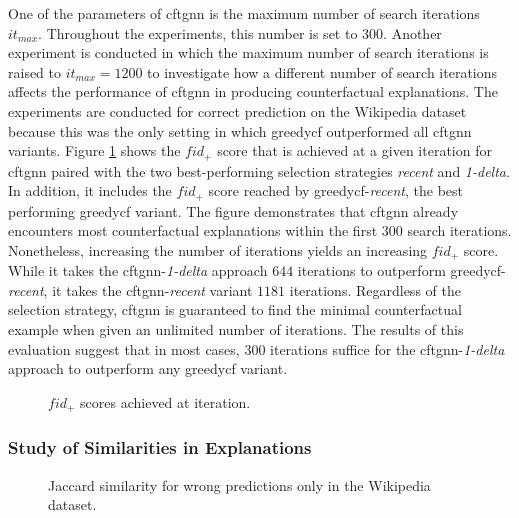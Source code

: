 One of the parameters of \gls{cftgnn} is the maximum number of search iterations $it_{max}$. Throughout the experiments, this number is set to $300$. Another experiment is conducted in which the maximum number of search iterations is raised to $it_{max}=1200$ to investigate how a different number of search iterations affects the performance of \gls{cftgnn} in producing counterfactual explanations. The experiments are conducted for correct prediction on the Wikipedia dataset because this was the only setting in which \gls{greedycf} outperformed all \gls{cftgnn} variants. Figure \ref{f_fid_iteration} shows the $fid_+$ score that is achieved at a given iteration for \gls{cftgnn} paired with the two best-performing selection strategies \textit{recent} and \textit{1-delta}. In addition, it includes the $fid_+$ score reached by \gls{greedycf}-\textit{recent}, the best performing \gls{greedycf} variant. The figure demonstrates that \gls{cftgnn} already encounters most counterfactual explanations within the first $300$ search iterations. Nonetheless, increasing the number of iterations yields an increasing $fid_+$ score. While it takes the \gls{cftgnn}-\textit{1-delta} approach $644$ iterations to outperform \gls{greedycf}-\textit{recent}, it takes the \gls{cftgnn}-\textit{recent} variant $1181$ iterations. Regardless of the selection strategy, \gls{cftgnn} is guaranteed to find the minimal counterfactual example when given an unlimited number of iterations. The results of this evaluation suggest that in most cases, $300$ iterations suffice for the \gls{cftgnn}-\textit{1-delta} approach to outperform any \gls{greedycf} variant.



\begin{figure}[ht]
    \centering
    
    \caption{$fid_+$ scores achieved at iteration.}
    \label{f_fid_iteration}
\end{figure}



\FloatBarrier
\subsubsection{Study of Similarities in Explanations}
\label{s_Evaluation_Results_Similarities}


\begin{figure}
    \centering
    
    \caption{Jaccard similarity for wrong predictions only in the Wikipedia dataset.}
    \label{f_jaccard_similarity_wiki}
\end{figure}



